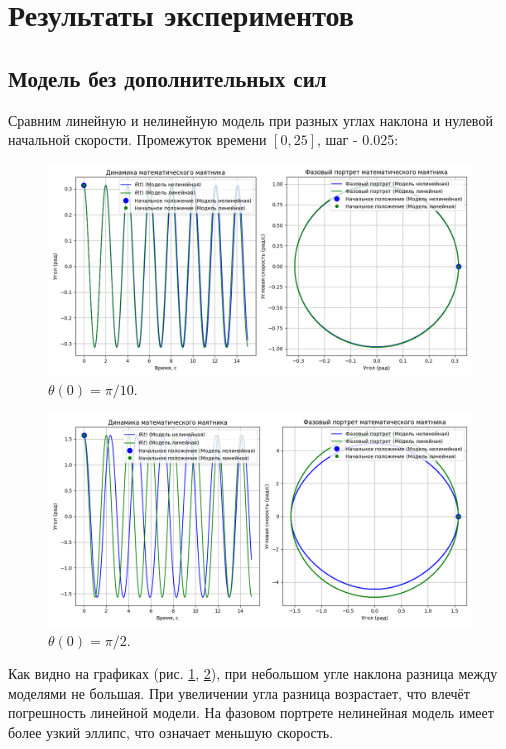 \section{Результаты  экспериментов}
\subsection*{Модель без дополнительных сил}
Сравним линейную и нелинейную модель при разных углах наклона и нулевой начальной скорости. Промежуток времени $[0,25]$, шаг - 0.025:
\begin{figure}[h]  %
	\centering
	\includegraphics[width=1\textwidth]{imgs/pi10.png}  %
	\caption{$\theta(0) = \pi / 10$.}  %
	\label{fig:pi10}  %
\end{figure}
\begin{figure}[h]  %
	\centering
	\includegraphics[width=1\textwidth]{imgs/pi2.png}  %
	\caption{$\theta(0) = \pi / 2$.}  %
	\label{fig:pi2}  %
\end{figure}

Как видно на графиках (рис. \ref{fig:pi10}, \ref{fig:pi2}), при небольшом угле наклона разница между моделями не большая. При увеличении угла разница возрастает, что влечёт погрешность линейной модели. На фазовом портрете нелинейная модель имеет более узкий эллипс, что означает меньшую скорость. 

